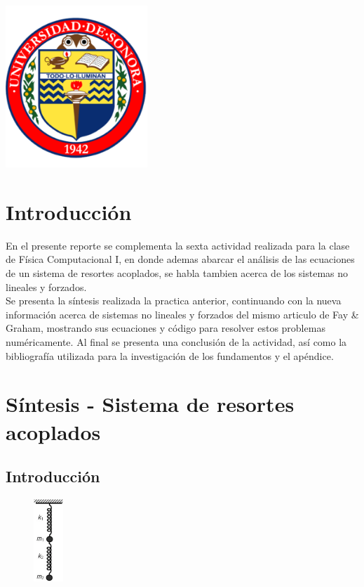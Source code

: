 \documentclass[12pt]{article}
\begin{document}
\begin{titlepage}
\includegraphics[width=0.4\textwidth]{logo.png}\\
 

\vfill %

\end{titlepage}

\section{Introducción}
En el presente reporte se complementa la sexta actividad realizada para la clase de Física Computacional I, en donde ademas abarcar el análisis de las ecuaciones de un sistema de resortes acoplados, se habla tambien acerca de los sistemas no lineales y forzados. \\

Se presenta la síntesis realizada la practica anterior, continuando con la nueva información acerca de sistemas no lineales y forzados del mismo articulo de Fay \& Graham, mostrando sus ecuaciones y código para resolver estos problemas numéricamente.  Al final se presenta una conclusión de la actividad, así como la bibliografía utilizada para la investigación de los fundamentos y el apéndice. 

\section{Síntesis - Sistema de resortes acoplados}

\subsection{Introducción}

\begin{figure}
    \centering
    \includegraphics[width=0.1\textwidth]{ResorteAcoplado.png}
\end{figure}
\end{document}
